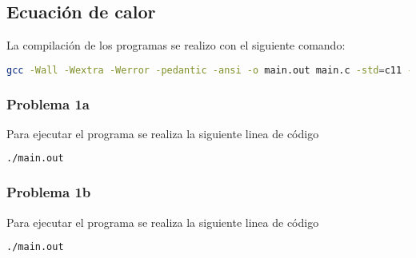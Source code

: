 \subsection{Ecuación de calor}

La compilación de los programas se realizo con el siguiente comando:

\begin{lstlisting}[language=bash]
    gcc -Wall -Wextra -Werror -pedantic -ansi -o main.out main.c -std=c11 -lm
\end{lstlisting}

\subsubsection{Problema 1a}

Para ejecutar el programa se realiza la siguiente linea de código

\begin{lstlisting}[language=bash]
    ./main.out
\end{lstlisting}

\subsubsection{Problema 1b}

Para ejecutar el programa se realiza la siguiente linea de código

\begin{lstlisting}[language=bash]
    ./main.out
\end{lstlisting}